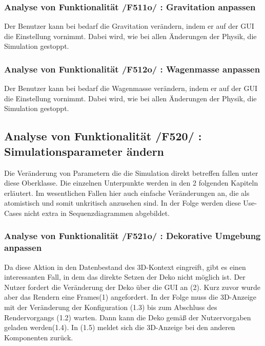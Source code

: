 \subsubsection{Analyse von Funktionalität /F511o/ :  Gravitation anpassen}
Der Benutzer kann bei bedarf die Gravitation verändern, indem er auf der GUI die Einstellung vornimmt. Dabei wird, wie bei allen Änderungen der Physik, die Simulation gestoppt.
\subsubsection{Analyse von Funktionalität /F512o/ :  Wagenmasse anpassen}
Der Benutzer kann bei bedarf die Wagenmasse verändern, indem er auf der GUI die Einstellung vornimmt. Dabei wird, wie bei allen Änderungen der Physik, die Simulation gestoppt.
\subsection{Analyse von Funktionalität /F520/ :  Simulationsparameter ändern}
Die Veränderung von Parametern die die Simulation direkt betreffen fallen unter diese Oberklasse. Die einzelnen Unterpunkte werden in den 2 folgenden Kapiteln erläutert. Im wesentlichen Fallen hier 
auch einfache Veränderungen an, die als atomistisch und somit unkritisch anzusehen sind. In der Folge werden diese Use-Cases nicht extra in Sequenzdiagrammen abgebildet.
\subsubsection{Analyse von Funktionalität /F521o/ :  Dekorative Umgebung anpassen}
Da diese Aktion in den Datenbestand des 3D-Kontext eingreift, gibt es einen interessanten Fall, in dem das direkte Setzen der Deko nicht möglich ist. 
Der Nutzer fordert die Veränderung der Deko über die GUI an (2). Kurz zuvor wurde aber das Rendern eine Frames(1) angefordert. In der Folge muss die 3D-Anzeige mit der Veränderung der Konfiguration (1.3)
bis zum Abschluss des Rendervorgangs (1.2) warten. Dann kann die Deko gemäß der Nutzervorgaben geladen werden(1.4). In (1.5) meldet sich die 3D-Anzeige bei den anderen Komponenten zurück. 

